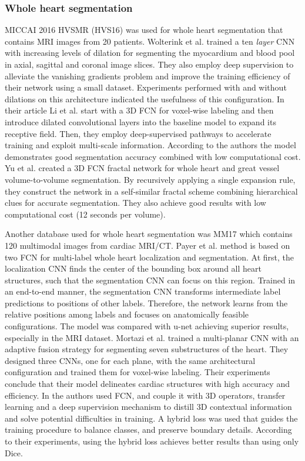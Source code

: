 \documentclass[journal]{IEEEtran}
\begin{document}
\subsubsection{Whole heart segmentation}
MICCAI 2016 HVSMR (HVS16) was used for whole heart segmentation that contains MRI images from 20 patients.
Wolterink et al.\cite{wolterink2016dilated} trained a ten \textit{layer} CNN with increasing levels of dilation for segmenting the myocardium and blood pool in axial, sagittal and coronal image slices.
They also employ deep supervision\cite{lee2015deeply} to alleviate the vanishing gradients problem and improve the training efficiency of their network using a small dataset.
Experiments performed with and without dilations on this architecture indicated the usefulness of this configuration.
In their article Li et al.\cite{li2016automatic} start with a 3D FCN for voxel-wise labeling and then introduce dilated convolutional layers into the baseline model to expand its receptive field.
Then, they employ deep-supervised pathways to accelerate training and exploit multi-scale information.
According to the authors the model demonstrates good segmentation accuracy combined with low computational cost.
Yu et al.\cite{yu20163d} created a 3D FCN fractal network for whole heart and great vessel volume-to-volume segmentation.
By recursively applying a single expansion rule, they construct the network in a self-similar fractal scheme combining hierarchical clues for accurate segmentation.
They also achieve good results with low computational cost (12 seconds per volume).

Another database used for whole heart segmentation was MM17 which contains 120 multimodal images from cardiac MRI/CT\@.
Payer et al.\cite{payer2017multi} method is based on two FCN for multi-label whole heart localization and segmentation.
At first, the localization CNN finds the center of the bounding box around all heart structures, such that the segmentation CNN can focus on this region.
Trained in an end-to-end manner, the segmentation CNN transforms intermediate label predictions to positions of other labels.
Therefore, the network learns from the relative positions among labels and focuses on anatomically feasible configurations.
The model was compared with u-net achieving superior results, especially in the MRI dataset.
Mortazi et al.\cite{mortazi2017multi} trained a multi-planar CNN with an adaptive fusion strategy for segmenting seven substructures of the heart.
They designed three CNNs, one for each plane, with the same architectural configuration and trained them for voxel-wise labeling.
Their experiments conclude that their model delineates cardiac structures with high accuracy and efficiency.
In\cite{yang2017hybrid} the authors used FCN, and couple it with 3D operators, transfer learning and a deep supervision mechanism to distill 3D contextual information and solve potential difficulties in training.
A hybrid loss was used that guides the training procedure to balance classes, and preserve boundary details.
According to their experiments, using the hybrid loss achieves better results than using only Dice.
\end{document}

